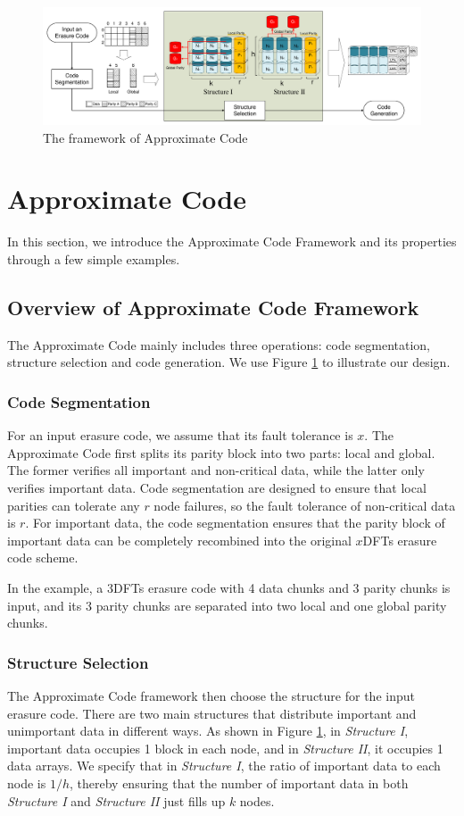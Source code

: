 \documentclass[sigconf]{acmart}
\begin{document}
\begin{figure}[ht!]
\centering
\includegraphics[width=\linewidth]{photo/Framework-v2.pdf}
\caption{The framework of Approximate Code}
\label{fig-framework}
\end{figure}

\section{Approximate Code}\label{ApCode}
In this section, we introduce the Approximate Code Framework and its properties through a few simple examples. 

\subsection{Overview of Approximate Code Framework}
The Approximate Code mainly includes three operations: code segmentation, structure selection and code generation. We use Figure \ref{fig-framework} to illustrate our design.

\subsubsection{Code Segmentation}
For an input erasure code, we assume that its fault tolerance is $x$. The Approximate Code first splits its parity block into two parts: local and global. The former verifies all important and non-critical data, while the latter only verifies important data. Code segmentation are designed to ensure that local parities can tolerate any $r$ node failures, so the fault tolerance of non-critical data is $r$. For important data, the code segmentation ensures that the parity block of important data can be completely recombined into the original $x$DFTs erasure code scheme. 

In the example, a 3DFTs erasure code with 4 data chunks and 3 parity chunks is input, and its 3 parity chunks are separated into two local and one global parity chunks.

\subsubsection{Structure Selection}
The Approximate Code framework then choose the structure for the input erasure code.
There are two main structures that distribute important and unimportant data in different ways.
As shown in Figure \ref{fig-framework}, in \emph{Structure I}, important data occupies 1 block in each node, and in \emph{Structure II}, it occupies 1 data arrays.
We specify that in \emph{Structure I}, the ratio of important data to each node is $1/h$, thereby ensuring that the number of important data in both \emph{Structure I} and \emph{Structure II} just fills up $k$ nodes.
\end{document}
